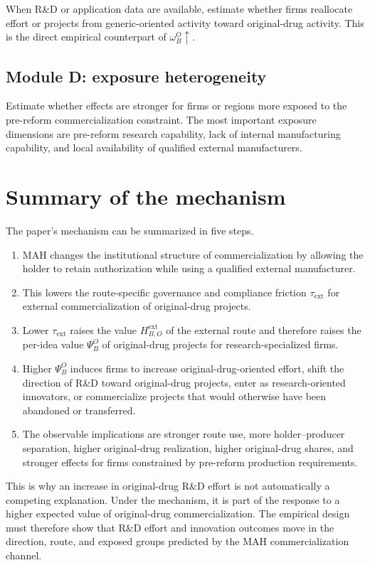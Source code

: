 \documentclass[12pt]{article}
\newcommand{\tauext}{\tau_{\mathrm{ext}}}
\begin{document}
When R\&D or application data are available, estimate whether firms reallocate effort or projects from generic-oriented activity toward original-drug activity. This is the direct empirical counterpart of $\omega_B^O\uparrow$.

\subsection{Module D: exposure heterogeneity}

Estimate whether effects are stronger for firms or regions more exposed to the pre-reform commercialization constraint. The most important exposure dimensions are pre-reform research capability, lack of internal manufacturing capability, and local availability of qualified external manufacturers.

\section{Summary of the mechanism}

The paper's mechanism can be summarized in five steps.
\begin{enumerate}
    \item MAH changes the institutional structure of commercialization by allowing the holder to retain authorization while using a qualified external manufacturer.
    \item This lowers the route-specific governance and compliance friction $\tauext$ for external commercialization of original-drug projects.
    \item Lower $\tauext$ raises the value $H_{B,O}^{\mathrm{ext}}$ of the external route and therefore raises the per-idea value $\Psi_B^O$ of original-drug projects for research-specialized firms.
    \item Higher $\Psi_B^O$ induces firms to increase original-drug-oriented effort, shift the direction of R\&D toward original-drug projects, enter as research-oriented innovators, or commercialize projects that would otherwise have been abandoned or transferred.
    \item The observable implications are stronger route use, more holder--producer separation, higher original-drug realization, higher original-drug shares, and stronger effects for firms constrained by pre-reform production requirements.
\end{enumerate}

This is why an increase in original-drug R\&D effort is not automatically a competing explanation. Under the mechanism, it is part of the response to a higher expected value of original-drug commercialization. The empirical design must therefore show that R\&D effort and innovation outcomes move in the direction, route, and exposed groups predicted by the MAH commercialization channel.
\end{document}
